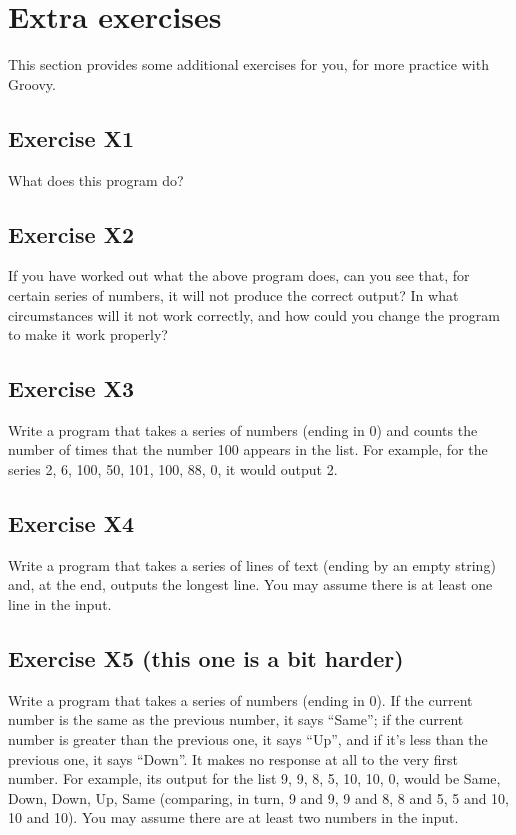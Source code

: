 \section{Extra exercises}
\label{sec:additional-exercises}

This section provides some additional exercises for you, for more
practice with Groovy.  

\subsection*{Exercise X1}

What does this program do?


\subsection*{Exercise X2}

If you have worked out what the above program does, can you
see that, for certain series of numbers, it will not produce the correct
output?  In what circumstances will it not work correctly, and how could
you change the program to make it work properly?

\subsection*{Exercise X3}

Write a program that takes a series of numbers (ending in 0) and counts
the number of times that the number 100 appears in the list.  For example,
for the series 2, 6, 100, 50, 101, 100, 88, 0, it would output 2.

\subsection*{Exercise X4}

Write a program that takes a series of lines of text (ending by 
an empty string) and,
at the end, outputs the longest line.
You may assume there is at least one line in the input.

\subsection*{Exercise X5 (this one is a bit harder)}

Write a program that takes
a series of numbers (ending in 0).  If the
current number is the same as the previous number, it says ``Same'';
if the current number is greater than the previous one, it says ``Up'',
and if it's less than the previous one, it says ``Down''.
It makes no response at all to the
very first number.  For example, its output for the list 9, 9, 8, 5,
10, 10, 0,
would be Same, Down, Down, Up, Same
(comparing, in turn, 9 and 9, 9 and 8, 8 and 5, 5 and 10, 10 and 10).
You may assume there are at least two numbers in the input.

